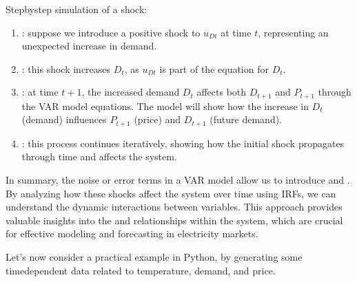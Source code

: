 \documentclass[letterpaper,10pt,english]{jupyterBook}
\begin{document}
\sphinxAtStartPar
Step\sphinxhyphen{}by\sphinxhyphen{}step simulation of a shock:
\begin{enumerate}
%
\item {} 
\sphinxAtStartPar
{}: suppose we introduce a positive shock to \(u_{Dt}\) at time \(t\), representing an unexpected increase in demand.

\item {} 
\sphinxAtStartPar
{}: this shock increases \(D_t\), as \(u_{Dt}\) is part of the equation for \(D_t\).

\item {} 
\sphinxAtStartPar
{}: at time \(t+1\), the increased demand \(D_t\) affects both \(D_{t+1}\) and \(P_{t+1}\) through the VAR model equations. The model will show how the increase in \(D_t\) (demand) influences \(P_{t+1}\) (price) and \(D_{t+1}\) (future demand).

\item {} 
\sphinxAtStartPar
{}: this process continues iteratively, showing how the initial shock propagates through time and affects the system.

\end{enumerate}

\sphinxAtStartPar
In summary, the noise or error terms in a VAR model allow us to introduce and . By analyzing how these shocks affect the system over time using IRFs, we can understand the dynamic interactions between variables. This approach provides valuable insights into the  and relationships within the system, which are crucial for effective modeling and forecasting in electricity markets.

\sphinxAtStartPar
Let’s now consider a practical example in Python, by generating some time\sphinxhyphen{}dependent data related to temperature, demand, and price.
\end{document}
